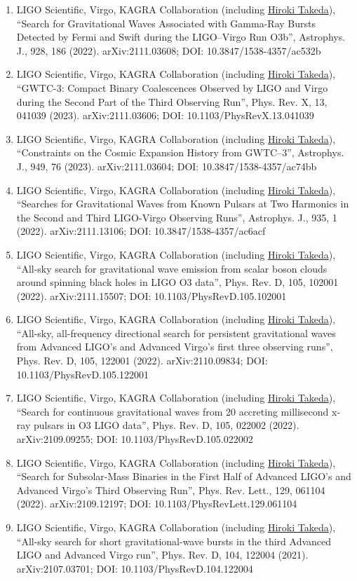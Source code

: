 \documentclass[uplatex, 11pt]{jsarticle}
\begin{document}
\begin{enumerate}
\item LIGO Scientific, Virgo, KAGRA Collaboration (including \uline{Hiroki Takeda}), “Search for Gravitational Waves Associated with Gamma-Ray Bursts Detected by Fermi and Swift during the LIGO–Virgo Run O3b”, Astrophys. J., 928, 186 (2022). arXiv:2111.03608; DOI: 10.3847/1538-4357/ac532b
\item LIGO Scientific, Virgo, KAGRA Collaboration (including \uline{Hiroki Takeda}), “GWTC-3: Compact Binary Coalescences Observed by LIGO and Virgo during the Second Part of the Third Observing Run”, Phys. Rev. X, 13, 041039 (2023). arXiv:2111.03606; DOI: 10.1103/PhysRevX.13.041039
\item LIGO Scientific, Virgo, KAGRA Collaboration (including \uline{Hiroki Takeda}), “Constraints on the Cosmic Expansion History from GWTC–3”, Astrophys. J., 949, 76 (2023). arXiv:2111.03604; DOI: 10.3847/1538-4357/ac74bb
\item LIGO Scientific, Virgo, KAGRA Collaboration (including \uline{Hiroki Takeda}), “Searches for Gravitational Waves from Known Pulsars at Two Harmonics in the Second and Third LIGO-Virgo Observing Runs”, Astrophys. J., 935, 1 (2022). arXiv:2111.13106; DOI: 10.3847/1538-4357/ac6acf
\item LIGO Scientific, Virgo, KAGRA Collaboration (including \uline{Hiroki Takeda}), “All-sky search for gravitational wave emission from scalar boson clouds around spinning black holes in LIGO O3 data”, Phys. Rev. D, 105, 102001 (2022). arXiv:2111.15507; DOI: 10.1103/PhysRevD.105.102001
\item LIGO Scientific, Virgo, KAGRA Collaboration (including \uline{Hiroki Takeda}), “All-sky, all-frequency directional search for persistent gravitational waves from Advanced LIGO's and Advanced Virgo's first three observing runs”, Phys. Rev. D, 105, 122001 (2022). arXiv:2110.09834; DOI: 10.1103/PhysRevD.105.122001
\item LIGO Scientific, Virgo, KAGRA Collaboration (including \uline{Hiroki Takeda}), “Search for continuous gravitational waves from 20 accreting millisecond
x-ray pulsars in O3 LIGO data”, Phys. Rev. D, 105, 022002 (2022). arXiv:2109.09255; DOI: 10.1103/PhysRevD.105.022002
\item LIGO Scientific, Virgo, KAGRA Collaboration (including \uline{Hiroki Takeda}), “Search for Subsolar-Mass Binaries in the First Half of Advanced LIGO's and Advanced Virgo's Third Observing Run”, Phys. Rev. Lett., 129, 061104 (2022). arXiv:2109.12197; DOI: 10.1103/PhysRevLett.129.061104
\item LIGO Scientific, Virgo, KAGRA Collaboration (including \uline{Hiroki Takeda}), “All-sky search for short gravitational-wave bursts in the third Advanced LIGO and Advanced Virgo run”, Phys. Rev. D, 104, 122004 (2021). arXiv:2107.03701; DOI: 10.1103/PhysRevD.104.122004

\end{enumerate}
\end{document}
